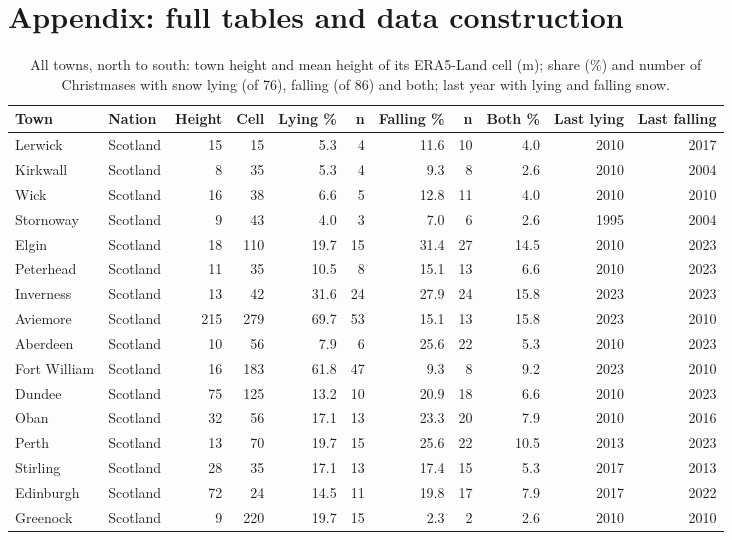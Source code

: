 \documentclass[11pt,a4paper]{article}
\begin{document}
\appendix
\section{Appendix: full tables and data construction}
{\scriptsize\setlength{\tabcolsep}{3pt}\begin{longtable}{llrrrrrrrrr}\caption{All towns, north to south: town height and mean height of its ERA5-Land cell (m); share (\%) and number of Christmases with snow lying (of 76), falling (of 86) and both; last year with lying and falling snow.}\label{tab:all}\\\toprule Town & Nation & Height & Cell & Lying \% & n & Falling \% & n & Both \% & Last lying & Last falling\\\midrule\endhead
Lerwick & Scotland & 15 & 15 & 5.3 & 4 & 11.6 & 10 & 4.0 & 2010 & 2017\\
Kirkwall & Scotland & 8 & 35 & 5.3 & 4 & 9.3 & 8 & 2.6 & 2010 & 2004\\
Wick & Scotland & 16 & 38 & 6.6 & 5 & 12.8 & 11 & 4.0 & 2010 & 2010\\
Stornoway & Scotland & 9 & 43 & 4.0 & 3 & 7.0 & 6 & 2.6 & 1995 & 2004\\
Elgin & Scotland & 18 & 110 & 19.7 & 15 & 31.4 & 27 & 14.5 & 2010 & 2023\\
Peterhead & Scotland & 11 & 35 & 10.5 & 8 & 15.1 & 13 & 6.6 & 2010 & 2023\\
Inverness & Scotland & 13 & 42 & 31.6 & 24 & 27.9 & 24 & 15.8 & 2023 & 2023\\
Aviemore & Scotland & 215 & 279 & 69.7 & 53 & 15.1 & 13 & 15.8 & 2023 & 2010\\
Aberdeen & Scotland & 10 & 56 & 7.9 & 6 & 25.6 & 22 & 5.3 & 2010 & 2023\\
Fort William & Scotland & 16 & 183 & 61.8 & 47 & 9.3 & 8 & 9.2 & 2023 & 2010\\
Dundee & Scotland & 75 & 125 & 13.2 & 10 & 20.9 & 18 & 6.6 & 2010 & 2023\\
Oban & Scotland & 32 & 56 & 17.1 & 13 & 23.3 & 20 & 7.9 & 2010 & 2016\\
Perth & Scotland & 13 & 70 & 19.7 & 15 & 25.6 & 22 & 10.5 & 2013 & 2023\\
Stirling & Scotland & 28 & 35 & 17.1 & 13 & 17.4 & 15 & 5.3 & 2017 & 2013\\
Edinburgh & Scotland & 72 & 24 & 14.5 & 11 & 19.8 & 17 & 7.9 & 2017 & 2022\\
Greenock & Scotland & 9 & 220 & 19.7 & 15 & 2.3 & 2 & 2.6 & 2010 & 2010\\

\end{longtable}}
\end{document}
